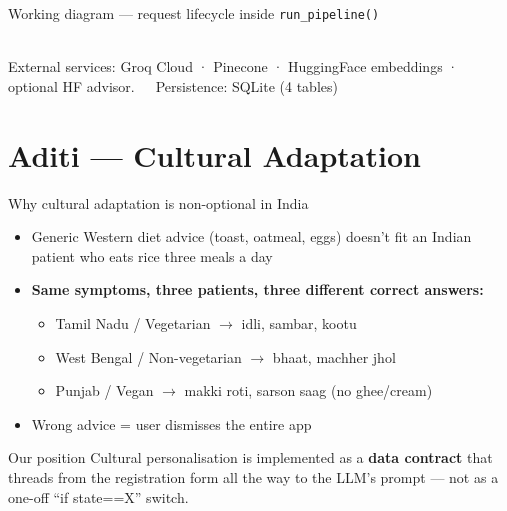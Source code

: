 \documentclass[aspectratio=169,11pt]{beamer}
\begin{document}
\begin{frame}{Working diagram --- request lifecycle inside \texttt{run\_pipeline()}}
{}\\[2pt]
  {\tiny External services: Groq Cloud · Pinecone · HuggingFace embeddings · optional HF advisor.~~~Persistence: SQLite (4 tables)}
\end{frame}

\section{Aditi --- Cultural Adaptation}

\begin{frame}{Why cultural adaptation is non-optional in India}
  \begin{itemize}
    \item Generic Western diet advice (toast, oatmeal, eggs) doesn't fit an Indian patient who eats rice three meals a day
    \item \textbf{Same symptoms, three patients, three different correct answers:}
    \begin{itemize}\small
      \item Tamil Nadu / Vegetarian $\rightarrow$ idli, sambar, kootu
      \item West Bengal / Non-vegetarian $\rightarrow$ bhaat, machher jhol
      \item Punjab / Vegan $\rightarrow$ makki roti, sarson saag (no ghee/cream)
    \end{itemize}
    \item Wrong advice = user dismisses the entire app
  \end{itemize}
  \vfill
  \begin{exampleblock}{Our position}
    Cultural personalisation is implemented as a \textbf{data contract} that threads from the registration form all the way to the LLM's prompt --- not as a one-off ``if state==X'' switch.
  \end{exampleblock}
\end{frame}
\end{document}
